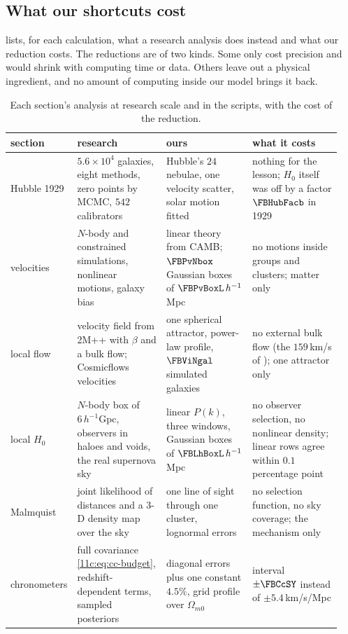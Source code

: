 \subsection{What our shortcuts cost}
\label{11c:sec:research-nerfs}

 lists, for each calculation, what a research analysis does instead
and what our reduction costs. The reductions are of two kinds. Some only cost precision and
would shrink with computing time or data. Others leave out a physical ingredient, and no
amount of computing inside our model brings it back.

\begin{table}[htbp]
\centering
\small
\renewcommand{\arraystretch}{1.15}
\begin{tabular}{@{}p{0.14\linewidth}p{0.27\linewidth}p{0.26\linewidth}p{0.27\linewidth}@{}}
\toprule
section & research & ours & what it costs\\\midrule
Hubble 1929 & $5.6\times10^4$ galaxies, eight methods, zero points by MCMC, $542$ calibrators &
Hubble's $24$ nebulae, one velocity scatter, solar motion fitted &
nothing for the lesson; $H_0$ itself was off by a factor $\FBHubFacb$ in 1929\\
velocities & $N$-body and constrained simulations, nonlinear motions, galaxy bias &
linear theory from CAMB; $\FBPvNbox$ Gaussian boxes of $\FBPvBoxL\,h^{-1}$Mpc &
no motions inside groups and clusters; matter only\\
local flow & velocity field from 2M++ with $\beta$ and a bulk flow; Cosmicflows velocities &
one spherical attractor, power-law profile, $\FBViNgal$ simulated galaxies &
no external bulk flow (the $159$\,km/s of \cite{Carrick2015}); one attractor only\\
local $H_0$ & $N$-body box of $6\,h^{-1}$Gpc, observers in haloes and voids, the real supernova sky &
linear $P(k)$, three windows, Gaussian boxes of $\FBLhBoxL\,h^{-1}$Mpc &
no observer selection, no nonlinear density; linear rows agree within $0.1$ percentage point\\
Malmquist & joint likelihood of distances and a 3-D density map over the sky &
one line of sight through one cluster, lognormal errors &
no selection function, no sky coverage; the mechanism only\\
chronometers & full covariance \eqref{11c:eq:cc-budget}, redshift-dependent terms, sampled posteriors &
diagonal errors plus one constant $4.5\%$, grid profile over $\Omega_{m0}$ &
interval $\pm\FBCcSY$ instead of $\pm5.4$\,km/s/Mpc\\
\bottomrule
\end{tabular}
\caption{Each section's analysis at research scale and in the scripts, with the cost of
the reduction.}
\label{11c:tab:nerfs}
\end{table}

